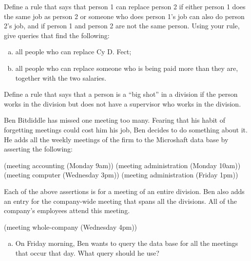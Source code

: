 \begin{exerciseGroup}
\label{Exercise 4.57}
 Define a rule that says that
person 1 can replace person 2 if either person 1 does the same job as person 2
or someone who does person 1's job can also do person 2's job, and if person 1
and person 2 are not the same person. Using your rule, give queries that find
the following:

\begin{enumerate}[a.]

\item
all people who can replace Cy D. Fect;

\item
all people who can replace someone who is being paid more than they are,
together with the two salaries.

\end{enumerate}

\label{Exercise 4.58}
 Define a rule that says that a
person is a ``big shot'' in a division if the person works in the division but
does not have a supervisor who works in the division.

\label{Exercise 4.59}
 Ben Bitdiddle has missed one
meeting too many.  Fearing that his habit of forgetting meetings could cost him
his job, Ben decides to do something about it.  He adds all the weekly meetings
of the firm to the Microshaft data base by asserting the following:

\begin{codeBlock}
(meeting accounting (Monday 9am))
(meeting administration (Monday 10am))
(meeting computer (Wednesday 3pm))
(meeting administration (Friday 1pm))
\end{codeBlock}

Each of the above assertions is for a meeting of an entire division.  Ben also
adds an entry for the company-wide meeting that spans all the divisions.  All
of the company's employees attend this meeting.

\begin{codeBlock}
(meeting whole-company (Wednesday 4pm))
\end{codeBlock}

\begin{enumerate}[a.]

\item
On Friday morning, Ben wants to query the data base for all the meetings that
occur that day.  What query should he use?


\end{enumerate}
\end{exerciseGroup}
